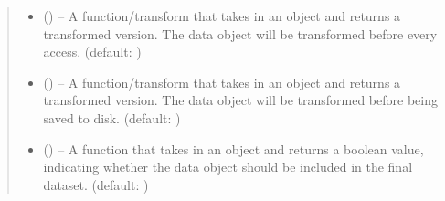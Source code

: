 \documentclass[letterpaper,10pt,english]{sphinxhowto}
\begin{document}
\begin{fulllineitems}
\begin{quote}
\begin{description}
\begin{itemize}
\item {} 
\sphinxAtStartPar
{} (\sphinxstyleliteralemphasis{\sphinxupquote{, }}) – A function/transform that takes in an  object and returns a transformed version. The data object will be transformed before every access. (default: )

\item {} 
\sphinxAtStartPar
{} (\sphinxstyleliteralemphasis{\sphinxupquote{, }}) – A function/transform that takes in an  object and returns a transformed version. The data object will be transformed before being saved to disk. (default: )

\item {} 
\sphinxAtStartPar
{} (\sphinxstyleliteralemphasis{\sphinxupquote{, }}) – A function that takes in an  object and returns a boolean value, indicating whether the data object should be included in the final dataset. (default: )

\end{itemize}

\end{description}\end{quote}

\begin{fulllineitems}
\label{\detokenize{top:top.ToPDataset.__init__}}
\pysigstartsignatures
{}
\pysigstopsignatures
\end{fulllineitems}


\end{fulllineitems}
\end{document}
